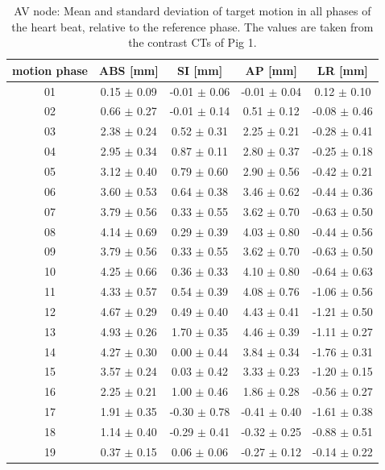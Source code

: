 \documentclass[type=dr, dr=rernat, accentcolor=tud7b,colorbacktitle, bigchapter, openright, twoside, 12pt ]{tudthesis}
\begin{document}
\begin{table}[htbp]
  \centering
    \tiny
  \caption{AV node: Mean and standard deviation of target motion in all phases of the heart beat, relative to the reference phase. The values are 
  taken from the contrast CTs of Pig 1.}
  \begin{tabular}{|c|c|c|c|c|}
    \hline\hline
    motion phase\rule{0pt}{2.6ex}\rule[-1.2ex]{0pt}{0pt} & ABS [mm] & SI [mm] & AP [mm] & LR [mm]\\
    \hline
01 &0.15 $\pm$ 0.09 &-0.01 $\pm$ 0.06 &-0.01 $\pm$ 0.04 &0.12 $\pm$ 0.10 \\
02 &0.66 $\pm$ 0.27 &-0.01 $\pm$ 0.14 &0.51 $\pm$ 0.12 &-0.08 $\pm$ 0.46 \\
03 &2.38 $\pm$ 0.24 &0.52 $\pm$ 0.31 &2.25 $\pm$ 0.21 &-0.28 $\pm$ 0.41 \\
04 &2.95 $\pm$ 0.34 &0.87 $\pm$ 0.11 &2.80 $\pm$ 0.37 &-0.25 $\pm$ 0.18 \\
05 &3.12 $\pm$ 0.40 &0.79 $\pm$ 0.60 &2.90 $\pm$ 0.56 &-0.42 $\pm$ 0.21 \\
06 &3.60 $\pm$ 0.53 &0.64 $\pm$ 0.38 &3.46 $\pm$ 0.62 &-0.44 $\pm$ 0.36 \\
07 &3.79 $\pm$ 0.56 &0.33 $\pm$ 0.55 &3.62 $\pm$ 0.70 &-0.63 $\pm$ 0.50 \\
08 &4.14 $\pm$ 0.69 &0.29 $\pm$ 0.39 &4.03 $\pm$ 0.80 &-0.44 $\pm$ 0.56 \\
09 &3.79 $\pm$ 0.56 &0.33 $\pm$ 0.55 &3.62 $\pm$ 0.70 &-0.63 $\pm$ 0.50 \\
10 &4.25 $\pm$ 0.66 &0.36 $\pm$ 0.33 &4.10 $\pm$ 0.80 &-0.64 $\pm$ 0.63 \\
11 &4.33 $\pm$ 0.57 &0.54 $\pm$ 0.39 &4.08 $\pm$ 0.76 &-1.06 $\pm$ 0.56 \\
12 &4.67 $\pm$ 0.29 &0.49 $\pm$ 0.40 &4.43 $\pm$ 0.41 &-1.21 $\pm$ 0.50 \\
13 &4.93 $\pm$ 0.26 &1.70 $\pm$ 0.35 &4.46 $\pm$ 0.39 &-1.11 $\pm$ 0.27 \\
14 &4.27 $\pm$ 0.30 &0.00 $\pm$ 0.44 &3.84 $\pm$ 0.34 &-1.76 $\pm$ 0.31 \\
15 &3.57 $\pm$ 0.24 &0.03 $\pm$ 0.42 &3.33 $\pm$ 0.23 &-1.20 $\pm$ 0.15 \\
16 &2.25 $\pm$ 0.21 &1.00 $\pm$ 0.46 &1.86 $\pm$ 0.28 &-0.56 $\pm$ 0.27 \\
17 &1.91 $\pm$ 0.35 &-0.30 $\pm$ 0.78 &-0.41 $\pm$ 0.40 &-1.61 $\pm$ 0.38 \\
18 &1.14 $\pm$ 0.40 &-0.29 $\pm$ 0.41 &-0.32 $\pm$ 0.25 &-0.88 $\pm$ 0.51 \\
19 &0.37 $\pm$ 0.15 &0.06 $\pm$ 0.06 &-0.27 $\pm$ 0.12 &-0.14 $\pm$ 0.22 \\
    \hline\hline
  \end{tabular}
  \label{tab:motion:AV:Pig1}
\end{table}
\end{document}
